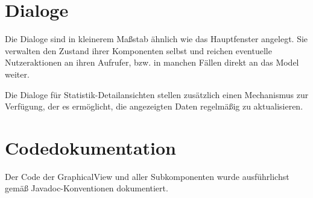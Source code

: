     \section{Dialoge}
    
        Die Dialoge sind in kleinerem Maßstab ähnlich wie das Hauptfenster
        angelegt. Sie verwalten den Zustand ihrer Komponenten selbst und reichen
        eventuelle Nutzeraktionen an ihren Aufrufer, bzw. in manchen Fällen
        direkt an das Model weiter.
        
        Die Dialoge für Statistik-Detailansichten stellen zusätzlich einen
        Mechanismus zur Verfügung, der es ermöglicht, die angezeigten Daten
        regelmäßig zu aktualisieren.
        
    \section{Codedokumentation}
    
        Der Code der GraphicalView und aller Subkomponenten wurde ausführlichst
        gemäß Javadoc-Konventionen dokumentiert.

